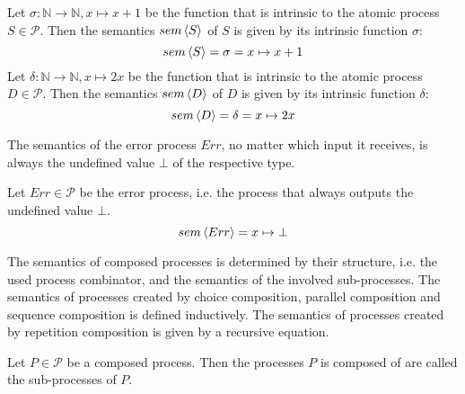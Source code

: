 \begin{example}
  \label{exp:sem_atomic}
  Let $\sigma \colon \mathbb{N} \to \mathbb{N}, x \mapsto x+1$ be the function that is intrinsic to the atomic process $S \in \mathcal{P}$. Then the semantics $sem \left\langle S \right\rangle$ of $S$ is given by its intrinsic function $\sigma$:
  \begin{equation*}
    sem \left\langle S \right\rangle = \sigma = x \mapsto x+1
  \end{equation*}
  Let $\delta \colon \mathbb{N} \to \mathbb{N}, x \mapsto 2x$ be the function that is intrinsic to the atomic process $D \in \mathcal{P}$. Then the semantics $sem \left\langle D \right\rangle$ of $D$ is given by its intrinsic function $\delta$:
  \begin{equation*}
    sem \left\langle D \right\rangle = \delta = x \mapsto 2x
  \end{equation*}
\end{example}


The semantics of the error process $Err$, no matter which input it receives, is always the undefined value $\bot$ of the respective type. 
\begin{definition}
\label{def:sem_err}
Let $Err \in \mathcal{P}$ be the error process, i.e. the process that always outputs the undefined value $\bot$.
  \begin{equation*}
    \label{eqn:sem_error}
    sem \left\langle Err \right\rangle = x \mapsto \bot
  \end{equation*}
  \hfill\qedsymbol
\end{definition}

The semantics of composed processes is determined by their structure, i.e. the used process combinator, and the semantics of the involved sub-processes. The semantics of processes created by choice composition, parallel composition and sequence composition is defined inductively. The semantics of processes created by repetition composition is given by a recursive equation.

\begin{definition}
Let $P \in \mathcal{P}$ be a composed process. Then the processes $P$ is composed of are called the sub-processes of $P$.

\hfill\qedsymbol
\end{definition}

